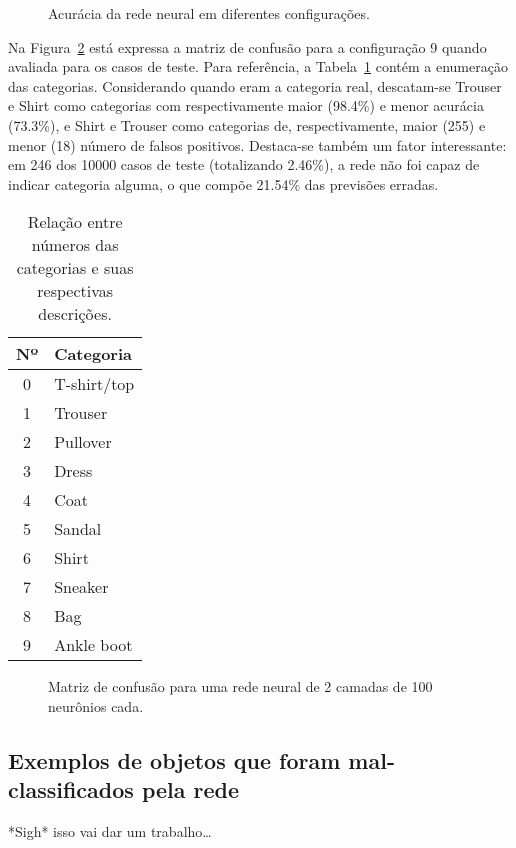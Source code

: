 \documentclass[twocolumn]{article}
\begin{document}
    \begin{figure}[ht]
        \centering{}
        \def\svgwidth{\columnwidth}
        
        \caption{%
            Acurácia da rede neural em diferentes
            configurações.\label{accuracy}
        }
    \end{figure}

    Na Figura~\ref{conf-matrix} está expressa a matriz de confusão para a
    configuração 9 quando avaliada para os casos de teste. Para referência, a
    Tabela~\ref{label-nums} contém a enumeração das categorias. Considerando
    quando eram a categoria real, descatam-se Trouser e Shirt como categorias
    com respectivamente maior (98.4\%) e menor acurácia (73.3\%), e Shirt e
    Trouser como categorias de, respectivamente, maior (255) e menor (18)
    número de falsos positivos.  Destaca-se também um fator interessante: em
    246 dos 10000 casos de teste (totalizando 2.46\%), a rede não foi capaz de
    indicar categoria alguma, o que compõe 21.54\% das previsões erradas.

    \begin{table}
        \centering
        \begin{tabular}{c l}
            \toprule
            Nº & Categoria \\
            \midrule
            0 & T-shirt/top \\
            1 & Trouser \\
            2 & Pullover \\
            3 & Dress \\
            4 & Coat \\
            5 & Sandal \\
            6 & Shirt \\
            7 & Sneaker \\
            8 & Bag \\
            9 & Ankle boot \\
            \bottomrule
        \end{tabular}
        \caption{%
            Relação entre números das categorias e suas respectivas
            descrições.\label{label-nums}
        }
    \end{table}

    \begin{figure}
        \centering{}
        \def\svgwidth{\columnwidth}
        
        \caption{Matriz de confusão para uma rede neural de 2 camadas de 100
        neurônios cada.\label{conf-matrix}}
    \end{figure}

    \subsection{Exemplos de objetos que foram mal-classificados pela rede}

    *Sigh* isso vai dar um trabalho\ldots

    
    
    \nocite{*}
\end{document}
